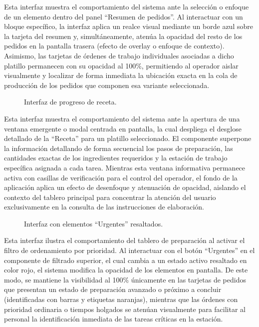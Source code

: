 Esta interfaz muestra el comportamiento del sistema ante la selección o enfoque de un elemento dentro del panel ``Resumen de pedidos''. Al interactuar con un bloque específico, la interfaz aplica un realce visual mediante un borde azul sobre la tarjeta del resumen y, simultáneamente, atenúa la opacidad del resto de los pedidos en la pantalla trasera (efecto de overlay o enfoque de contexto). Asimismo, las tarjetas de órdenes de trabajo individuales asociadas a dicho platillo permanecen con su opacidad al 100\%, permitiendo al operador aislar visualmente y localizar de forma inmediata la ubicación exacta en la cola de producción de los pedidos que componen esa variante seleccionada.

\begin{figure}[H]
    \centering
    
    \caption{Interfaz de progreso de receta.}
    \label{fig:ui-coc-06}
\end{figure}

Esta interfaz muestra el comportamiento del sistema ante la apertura de una ventana emergente o modal centrada en pantalla, la cual despliega el desglose detallado de la ``Receta'' para un platillo seleccionado. El componente superpone la información detallando de forma secuencial los pasos de preparación, las cantidades exactas de los ingredientes requeridos y la estación de trabajo específica asignada a cada tarea. Mientras esta ventana informativa permanece activa con casillas de verificación para el control del operador, el fondo de la aplicación aplica un efecto de desenfoque y atenuación de opacidad, aislando el contexto del tablero principal para concentrar la atención del usuario exclusivamente en la consulta de las instrucciones de elaboración.

\begin{figure}[H]
    \centering
    
    \caption{Interfaz con elementos ``Urgentes'' resaltados.}
    \label{fig:ui-coc-02-urgentes}
\end{figure}

Esta interfaz ilustra el comportamiento del tablero de preparación al activar el filtro de ordenamiento por prioridad. Al interactuar con el botón ``Urgentes'' en el componente de filtrado superior, el cual cambia a un estado activo resaltado en color rojo, el sistema modifica la opacidad de los elementos en pantalla. De este modo, se mantiene la visibilidad al 100\% únicamente en las tarjetas de pedidos que presentan un estado de preparación avanzado o próximo a concluir (identificadas con barras y etiquetas naranjas), mientras que las órdenes con prioridad ordinaria o tiempos holgados se atenúan visualmente para facilitar al personal la identificación inmediata de las tareas críticas en la estación.

